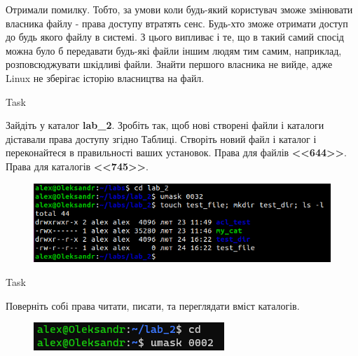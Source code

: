 \documentclass[a4paper,12pt]{article}
\newcommand{\RomanNumeralCaps}[1]{\MakeUppercase{\romannumeral #1}}
\begin{document}
    Отримали помилку. Тобто, за умови коли будь-який користувач зможе змінювати власника файлу - права доступу втратять сенс. 
    Будь-хто зможе отримати доступ до будь якого файлу в системі. З цього випливає і те, що в такий самий спосід можна було б передавати 
    будь-які файли іншим людям тим самим, наприклад, розповсюджувати шкідливі файли. Знайти першого власника не вийде, адже Linux не зберігає історію власництва на файл.

    \begin{center}
        \Large{Task \RomanNumeralCaps{13}}
    \end{center}
    Зайдіть у каталог \textbf{lab\_2}. Зробіть так, щоб нові створені файли і каталоги діставали права доступу згідно Таблиці. Створіть новий файл і каталог і переконайтеся в
    правильності ваших установок. Права для файлів \textbf{<<644>>}. Права для каталогів \textbf{<<745>>}.
    \begin{figure}[h!]
        \begin{minipage}[h]{1\linewidth}
            \centering
            \includegraphics[width=0.6\linewidth]{Prt sc/Figure_13.png}  
        \end{minipage}
    \end{figure}

\newpage
    \begin{center}
        \Large{Task \RomanNumeralCaps{14}}
    \end{center}
    Поверніть собі права читати, писати, та переглядати вміст каталогів.
    \begin{figure}[h!]
        \begin{minipage}[h]{1\linewidth}
            \centering
            \includegraphics[width=0.6\linewidth]{Prt sc/Figure_14.png}  
        \end{minipage}
    \end{figure}
\end{document}
